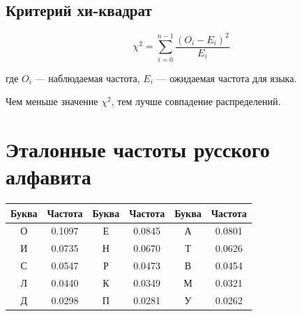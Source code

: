 \subsection*{Критерий хи-квадрат}

$$\chi^2 = \sum_{i=0}^{n-1} \frac{(O_i - E_i)^2}{E_i}$$

где $O_i$ --- наблюдаемая частота, $E_i$ --- ожидаемая частота для языка.

Чем меньше значение $\chi^2$, тем лучше совпадение распределений.

\section*{Эталонные частоты русского алфавита}

\begin{center}
\begin{tabular}{|c|c||c|c||c|c|}
\hline
Буква & Частота & Буква & Частота & Буква & Частота \\
\hline
О & 0.1097 & Е & 0.0845 & А & 0.0801 \\
И & 0.0735 & Н & 0.0670 & Т & 0.0626 \\
С & 0.0547 & Р & 0.0473 & В & 0.0454 \\
Л & 0.0440 & К & 0.0349 & М & 0.0321 \\
Д & 0.0298 & П & 0.0281 & У & 0.0262 \\
\hline
\end{tabular}
\end{center}
